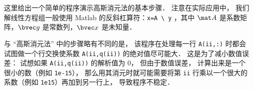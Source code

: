 

这里给出一个简单的程序演示高斯消元法的基本步骤． 注意在实际应用中， 我们解线性方程组一般使用 Matlab 的反斜杠算符：\lstinline|x=A \ y| ，其中 $\mat A$ 是系数矩阵，$\bvec y$ 是常数列，$\bvec x$ 是未知量．


与 “高斯消元法” 中的步骤略有不同的是， 该程序在处理每一行 \lstinline|A(ii,:)|  时都会试图做一个行交换使系数 \lstinline|A(ii,q(ii))| 的绝对值尽可能大． 这是为了减小数值误差： 试想如果 \lstinline|A(ii,q(ii))| 的解析值为 0， 但由于数值误差， 计算出来是一个很小的数（例如 \lstinline|1e-15|）， 那么用其消元时就可能需要将第 \lstinline|ii| 行乘以一个很大的系数（例如 \lstinline|1e15|）再加到另一行上， 导致程序不稳定．


